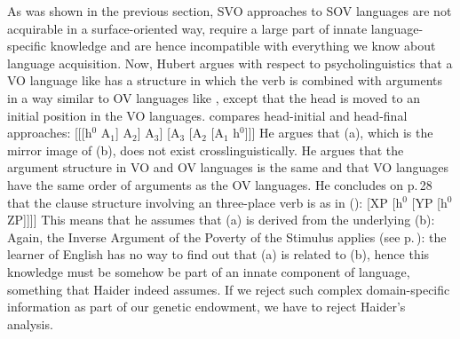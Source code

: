 As was shown in the previous section, SVO approaches to SOV languages are not acquirable in a
surface-oriented way, require a large part of innate language-specific knowledge and are hence
incompatible with everything we know about language acquisition. Now, Hubert
\citet{Haider2000a,Haider2010a,Haider2020a} argues with respect to psycholinguistics that a VO language like
 has a structure in which the verb is combined with arguments in a way similar to OV
languages like , except that the head is moved to an initial position in the VO languages.
\citet[]{Haider2010a} compares head-initial and head-final approaches:
\eal
\ex {}[[[h$^0$ A$_1$] A$_2$] A$_3$]
\ex {}[A$_3$ [A$_2$ [A$_1$ h$^0$]]]
\zl
He argues that (a), which is the mirror image of (b), does not exist crosslinguistically. He argues that the argument structure
in VO and OV languages is the same and that VO languages have the same order of arguments as the OV
languages.
He concludes on p.\,28 that the clause structure involving an  three-place verb is as in ():
\ea
\label{ex-Haider-English-head-movmenet}
{}[XP [h$^0$ [YP [h$^0$ ZP]]]]
\z
This means that he assumes that (a) is derived from the underlying (b):
\eal
{}
\zl
Again, the Inverse Argument of the Poverty of the Stimulus applies (see p.\,\pageref{pos-argument}): the learner of
English has no way to find out that (a) is related to (b), hence this knowledge must
be somehow be part of an innate component of language, something that Haider indeed assumes. If we
reject such complex domain-specific information as part of our genetic endowment, we have to reject Haider's analysis.

